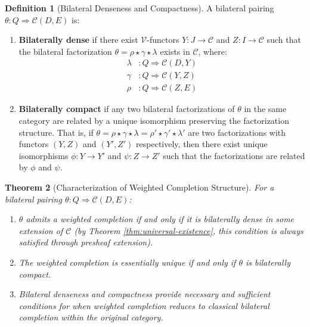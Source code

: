 \documentclass[11pt]{article}
\theoremstyle{plain}
\newtheorem{theorem}{Theorem}[section]
\theoremstyle{definition}
\newtheorem{definition}[theorem]{Definition}
\theoremstyle{remark}
\newcommand{\V}{\mathcal{V}}
\newcommand{\C}{\mathcal{C}}
\begin{document}
\begin{definition}[Bilateral Denseness and Compactness]\label{def:bilateral-conditions}
A bilateral pairing $\theta : Q \Rightarrow \C(D, E)$ is:

\begin{enumerate}
\item \textbf{Bilaterally dense} if there exist $\V$-functors $Y : J \to \C$ and $Z : I \to \C$ such that the bilateral factorization $\theta = \rho \star \gamma \star \lambda$ exists in $\C$, where:
\begin{align}
\lambda &: Q \Rightarrow \C(D, Y) \\
\gamma &: Q \Rightarrow \C(Y, Z) \\
\rho &: Q \Rightarrow \C(Z, E)
\end{align}

\item \textbf{Bilaterally compact} if any two bilateral factorizations of $\theta$ in the same category are related by a unique isomorphism preserving the factorization structure. That is, if $\theta = \rho \star \gamma \star \lambda = \rho' \star \gamma' \star \lambda'$ are two factorizations with functors $(Y, Z)$ and $(Y', Z')$ respectively, then there exist unique isomorphisms $\phi : Y \to Y'$ and $\psi : Z \to Z'$ such that the factorizations are related by $\phi$ and $\psi$.
\end{enumerate}
\end{definition}

\begin{theorem}[Characterization of Weighted Completion Structure]\label{thm:bilateral-characterization}
For a bilateral pairing $\theta : Q \Rightarrow \C(D, E)$:

\begin{enumerate}
\item $\theta$ admits a weighted completion if and only if it is bilaterally dense in some extension of $\C$ (by Theorem \ref{thm:universal-existence}, this condition is always satisfied through presheaf extension).

\item The weighted completion is essentially unique if and only if $\theta$ is bilaterally compact.

\item Bilateral denseness and compactness provide necessary and sufficient conditions for when weighted completion reduces to classical bilateral completion within the original category.
\end{enumerate}
\end{theorem}
\end{document}
